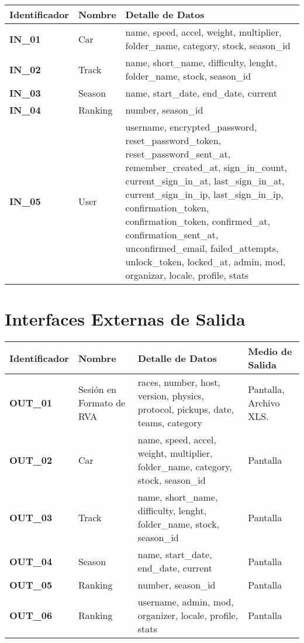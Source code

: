 \begin{center}
	\begin{tabular}{ | l | p{5.5cm} | p{8cm} |}
		\hline
		{\textbf{Identificador}} & 	{\textbf{Nombre}} & {\textbf{Detalle de Datos}} \\ \hline
		{\textbf{IN\_01}} & Car & name, speed, accel, weight, multiplier, folder\_name, category, stock, season\_id \\ \hline
		{\textbf{IN\_02}} & Track &  name, short\_name, difficulty, lenght, folder\_name, stock, season\_id \\ \hline
		{\textbf{IN\_03}} & Season & name, start\_date, end\_date, current \\ \hline
		{\textbf{IN\_04}} & Ranking & number, season\_id \\ \hline
		{\textbf{IN\_05}} & User & username, encrypted\_password, reset\_password\_token, reset\_password\_sent\_at, remember\_created\_at, sign\_in\_count, current\_sign\_in\_at, last\_sign\_in\_at, current\_sign\_in\_ip, last\_sign\_in\_ip, confirmation\_token, confirmation\_token, confirmed\_at, confirmation\_sent\_at, unconfirmed\_email, failed\_attempts, unlock\_token, locked\_at, admin, mod, organizar, locale, profile, stats \\ \hline
	\end{tabular}
\end{center}

\newpage

\section{Interfaces Externas de Salida}

\begin{center}
	\begin{tabular}{ | l | p{3.5cm} | p{6cm} | p{4cm} |}
		\hline
		{\textbf{Identificador}} & 	{\textbf{Nombre}} & {\textbf{Detalle de Datos}} & {\textbf{Medio de Salida}} \\
		\hline
		{\textbf{OUT\_01}} & Sesión en Formato de RVA & races, number, host, version, physics, protocol, pickups, date, teams, category & Pantalla, Archivo XLS. \\ \hline
		{\textbf{OUT\_02}} & Car & name, speed, accel, weight, multiplier, folder\_name, category, stock, season\_id & Pantalla \\ \hline
		{\textbf{OUT\_03}} & Track & name, short\_name, difficulty, lenght, folder\_name, stock, season\_id & Pantalla \\ \hline
		{\textbf{OUT\_04}} & Season & name, start\_date, end\_date, current & Pantalla \\ \hline
		{\textbf{OUT\_05}} & Ranking & number, season\_id & Pantalla \\ \hline
		{\textbf{OUT\_06}} & Ranking & username, admin, mod, organizer, locale, profile, stats & Pantalla \\ \hline
	\end{tabular}
\end{center}
